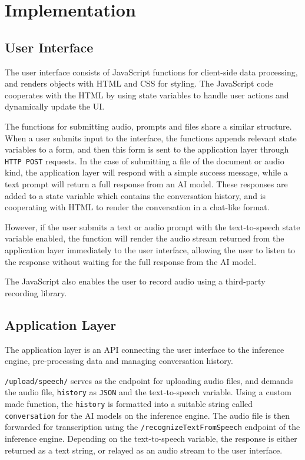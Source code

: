 \documentclass[twocolumn]{article}
\begin{document}
\section{Implementation}
\subsection{User Interface}
The user interface consists of JavaScript functions for client-side data processing, and renders objects with HTML and CSS for styling. The JavaScript code cooperates with the HTML by using state variables to handle user actions and dynamically update the UI.

The functions for submitting audio, prompts and files share a similar structure. \\
When a user submits input to the interface, the functions appends relevant state variables to a form, and then this form is sent to the application layer through \verb|HTTP POST| requests. In the case of submitting a file of the document or audio kind, the application layer will respond with a simple success message, while a text prompt will return a full response from an AI model. These responses are added to a state variable which contains the conversation history, and is cooperating with HTML to render the conversation in a chat-like format.

However, if the user submits a text or audio prompt with the text-to-speech state variable enabled, the function will render the audio stream returned from the application layer immediately to the user interface, allowing the user to listen to the response without waiting for the full response from the AI model.

The JavaScript also enables the user to record audio using a third-party recording library.

\subsection{Application Layer}
The application layer is an API connecting the user interface to the inference engine, pre-processing data and managing conversation history.

\verb|/upload/speech/| serves as the endpoint for uploading audio files, and demands the audio file, \verb|history| as \verb|JSON| and the text-to-speech variable. Using a custom made function, the \verb|history| is formatted into a suitable string called \verb|conversation| for the AI models on the inference engine. The audio file is then forwarded for transcription using the \verb|/recognizeTextFromSpeech| endpoint of the inference engine. Depending on the text-to-speech variable, the response is either returned as a text string, or relayed as an audio stream to the user interface.
\end{document}
